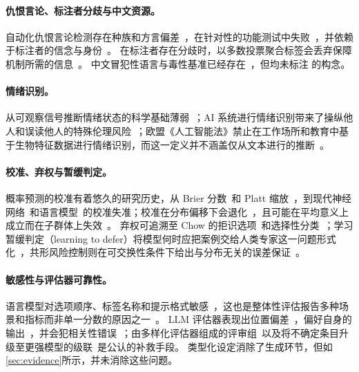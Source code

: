 \paragraph{仇恨言论、标注者分歧与中文资源。}
自动化仇恨言论检测存在种族和方言偏差~\cite{sap2019risk,davidson2019racial}，在针对性的功能测试中失败~\cite{rottger2021hatecheck}，并依赖于标注者的信念与身份~\cite{sap2022annotators}。
在标注者存在分歧时，以多数投票聚合标签会丢弃保障机制所需的信息~\cite{davani2022dealing,plank2022problem,pavlick2019inherent}。
中文冒犯性语言与毒性基准已经存在~\cite{deng2022cold,lu2023toxicn,jiang2022swsr}，但均未标注 \pol{} 的构念。

\paragraph{情绪识别。}
从可观察信号推断情绪状态的科学基础薄弱~\cite{barrett2019emotional}；AI 系统进行情绪识别带来了操纵他人和误读他人的特殊伦理风险~\cite{stark2021ethics}；欧盟《人工智能法》禁止在工作场所和教育中基于生物特征数据进行情绪识别，而这一定义并不涵盖仅从文本进行的推断~\cite{euaiact2024}。

\paragraph{校准、弃权与暂缓判定。}
概率预测的校准有着悠久的研究历史，从 Brier 分数~\cite{brier1950verification}和 Platt 缩放~\cite{platt1999probabilistic}，到现代神经网络~\cite{guo2017calibration,naeini2015obtaining}和语言模型~\cite{jiang2021can,kadavath2022language,tian2023just,xiong2024can}的校准失准；校准在分布偏移下会退化~\cite{ovadia2019trust}，且可能在平均意义上成立而在子群体上失效~\cite{hebertjohnson2018multicalibration}。
弃权可追溯至 Chow 的拒识选项~\cite{chow1970optimum}和选择性分类~\cite{geifman2017selective,kamath2020selective,wen2025know}；学习暂缓判定（learning to defer）将模型何时应把案例交给人类专家这一问题形式化~\cite{madras2018predict,mozannar2020consistent}，共形风险控制则在可交换性条件下给出与分布无关的误差保证~\cite{bates2021distribution,angelopoulos2024conformal}。

\paragraph{敏感性与评估器可靠性。}
语言模型对选项顺序、标签名称和提示格式敏感~\cite{zhao2021calibrate,lu2022fantastically,zheng2024large,pezeshkpour2024large,sclar2024quantifying,wei2023larger}，这也是整体性评估报告多种场景和指标而非单一分数的原因之一~\cite{liang2023holistic}。
LLM 评估器表现出位置偏差~\cite{wang2024fair}，偏好自身的输出~\cite{panickssery2024llm}，并会犯相关性错误~\cite{goel2025great}；由多样化评估器组成的评审组~\cite{verga2024replacing}以及将不确定条目升级至更强模型的级联~\cite{zheng2023judging,chen2023frugalgpt,jung2025trust}是公认的补救手段。
类型化设定消除了生成环节，但如\cref{sec:evidence}所示，并未消除这些问题。

